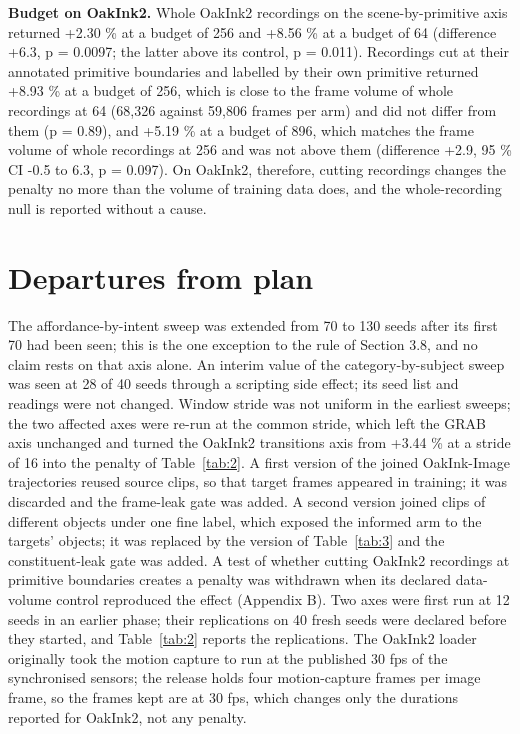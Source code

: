 \documentclass[10pt]{article}
\begin{document}
\textbf{Budget on OakInk2.} Whole OakInk2 recordings on the scene-by-primitive axis returned +2.30 \% at a budget of 256 and +8.56 \% at a budget of 64 (difference +6.3, p = 0.0097; the latter above its control, p = 0.011). Recordings cut at their annotated primitive boundaries and labelled by their own primitive returned +8.93 \% at a budget of 256, which is close to the frame volume of whole recordings at 64 (68,326 against 59,806 frames per arm) and did not differ from them (p = 0.89), and +5.19 \% at a budget of 896, which matches the frame volume of whole recordings at 256 and was not above them (difference +2.9, 95 \% CI -0.5 to 6.3, p = 0.097). On OakInk2, therefore, cutting recordings changes the penalty no more than the volume of training data does, and the whole-recording null is reported without a cause.

\section{Departures from plan}

The affordance-by-intent sweep was extended from 70 to 130 seeds after its first 70 had been seen; this is the one exception to the rule of Section 3.8, and no claim rests on that axis alone. An interim value of the category-by-subject sweep was seen at 28 of 40 seeds through a scripting side effect; its seed list and readings were not changed. Window stride was not uniform in the earliest sweeps; the two affected axes were re-run at the common stride, which left the GRAB axis unchanged and turned the OakInk2 transitions axis from +3.44 \% at a stride of 16 into the penalty of Table~\ref{tab:2}. A first version of the joined OakInk-Image trajectories reused source clips, so that target frames appeared in training; it was discarded and the frame-leak gate was added. A second version joined clips of different objects under one fine label, which exposed the informed arm to the targets' objects; it was replaced by the version of Table~\ref{tab:3} and the constituent-leak gate was added. A test of whether cutting OakInk2 recordings at primitive boundaries creates a penalty was withdrawn when its declared data-volume control reproduced the effect (Appendix B). Two axes were first run at 12 seeds in an earlier phase; their replications on 40 fresh seeds were declared before they started, and Table~\ref{tab:2} reports the replications. The OakInk2 loader originally took the motion capture to run at the published 30 fps of the synchronised sensors; the release holds four motion-capture frames per image frame, so the frames kept are at 30 fps, which changes only the durations reported for OakInk2, not any penalty.
\end{document}
